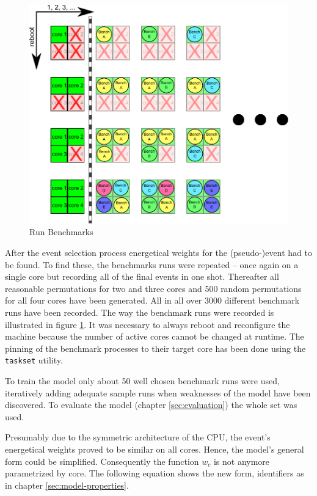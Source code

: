 \begin{figure}
  \centering
    \includegraphics[width=\textwidth]{fig/run-benchmarks.pdf}
  \caption{Run Benchmarks}
  \label{fig:run-benchmarks}
\end{figure}

After the event selection process energetical weights for the (pseudo-)event had
to be found. To find these, the benchmarks runs were repeated -- once again on a
single core but recording all of the final events in one shot. Thereafter all
reasonable permutations for two and three cores and 500 random permutations for
all four cores have been generated. All in all over 3000 different benchmark
runs have been recorded. The way the benchmark runs were recorded is illustrated
in figure \ref{fig:run-benchmarks}. It was necessary to always reboot and
reconfigure the machine because the number of active cores cannot be changed at
runtime. The pinning of the benchmark processes to their target core has been
done using the \texttt{taskset} utility.

To train the model only about 50 well chosen benchmark runs were used,
iteratively adding adequate sample runs when weaknesses of the model have been
discovered. To evaluate the model (chapter \ref{sec:evaluation}) the whole set
was used.

Presumably due to the symmetric architecture of the CPU, the event's energetical
weights proved to be similar on all cores. Hence, the model's general form could
be simplified. Consequently the function $w_c$ is not anymore parametrized by
core. The following equation shows the new form, identifiers as in chapter
\ref{sec:model-properties}.

